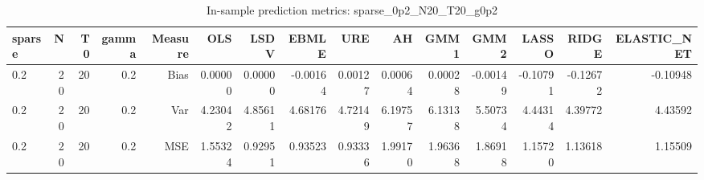 \begin{table}[!htbp]\centering
\caption{In-sample prediction metrics: sparse_0p2_N20_T20_g0p2}
\label{tab:table2_sparse_0p2_N20_T20_g0p2}
\begin{tabular}{lrrrrrrrrrrrrrr}
\hline
sparse & N & T0 & gamma & Measure & OLS & LSDV & EBMLE & URE & AH & GMM1 & GMM2 & LASSO & RIDGE & ELASTIC_NET \\
\hline
0.2 & 20 & 20 & 0.2 & Bias & 0.00000 & 0.00000 & -0.00164 & 0.00127 & 0.00064 & 0.00028 & -0.00149 & -0.10791 & -0.12672 & -0.10948 \\
0.2 & 20 & 20 & 0.2 & Var & 4.23042 & 4.85611 & 4.68176 & 4.72149 & 6.19757 & 6.13138 & 5.50734 & 4.44314 & 4.39772 & 4.43592 \\
0.2 & 20 & 20 & 0.2 & MSE & 1.55324 & 0.92951 & 0.93523 & 0.93336 & 1.99170 & 1.96368 & 1.86918 & 1.15720 & 1.13618 & 1.15509 \\
\hline
\end{tabular}
\end{table}


